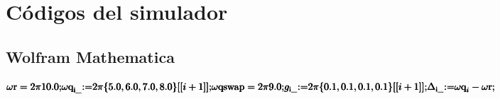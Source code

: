 \chapter{Códigos del simulador}

\section{Wolfram Mathematica}

\begin{doublespace}
\noindent\(\pmb{\text{$\omega $r}=2\pi  10.0;}\\
\pmb{\text{$\omega $q}_{\text{i$\_$}}\text{:=}2\pi \{5.0,6.0,7.0,8.0\}[[i+1]];}\\
\pmb{\text{$\omega $qswap}=2\pi  9.0;}\\
\pmb{g_{\text{i$\_$}}\text{:=}2\pi \{0.1,0.1,0.1,0.1\}[[i+1]];}\\
\pmb{\Delta _{\text{i$\_$}}\text{:=}\text{$\omega $q}_i-\text{$\omega $r};}\)
\end{doublespace}

